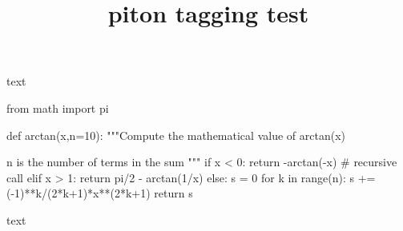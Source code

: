\documentclass{article}
\title{piton tagging test}
\begin{document}
text
\begin{Piton}
 from math import pi

 def arctan(x,n=10):
    """Compute the mathematical value of arctan(x)

    n is the number of terms in the sum
    """
     if x < 0:
         return -arctan(-x) # recursive call
     elif x > 1:
         return pi/2 - arctan(1/x)
     else:
         s = 0
         for k in range(n):
             s += (-1)**k/(2*k+1)*x**(2*k+1)
         return s
\end{Piton}
text
\end{document}
